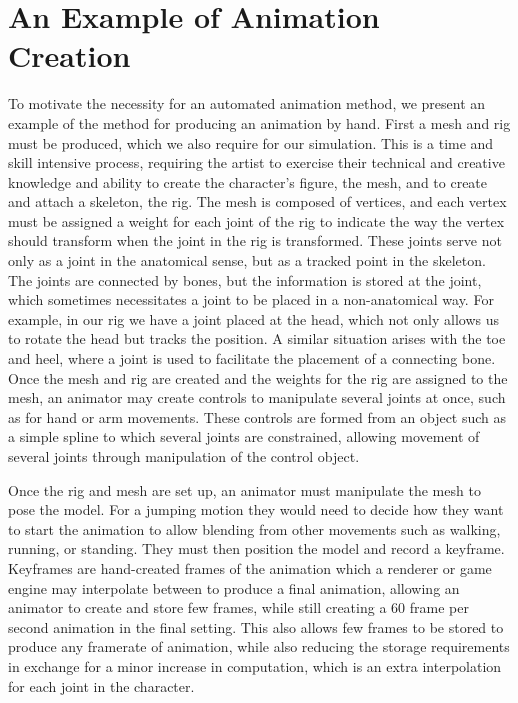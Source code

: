 \section{An Example of Animation Creation}
To motivate the necessity for an automated animation method, we present an example of the method for producing an animation by hand.  First a mesh and rig must be produced, which we also require for our simulation.  This is a time and skill intensive process, requiring the artist to exercise their technical and creative knowledge and ability to create the character's figure, the mesh, and to create and attach a skeleton, the rig.  The mesh is composed of vertices, and each vertex must be assigned a weight for each joint of the rig to indicate the way the vertex should transform when the joint in the rig is transformed.  These joints serve not only as a joint in the anatomical sense, but as a tracked point in the skeleton.  The joints are connected by bones, but the information is stored at the joint, which sometimes necessitates a joint to be placed in a non-anatomical way.  For example, in our rig we have a joint placed at the head, which not only allows us to rotate the head but tracks the position.  A similar situation arises with the toe and heel, where a joint is used to facilitate the placement of a connecting bone.  Once the mesh and rig are created and the weights for the rig are assigned to the mesh, an animator may create controls to manipulate several joints at once, such as for hand or arm movements.  These controls are formed from an object such as a simple spline to which several joints are constrained, allowing movement of several joints through manipulation of the control object.

Once the rig and mesh are set up, an animator must manipulate the mesh to pose the model.  For a jumping motion they would need to decide how they want to start the animation to allow blending from other movements such as walking, running, or standing.  They must then position the model and record a keyframe.  Keyframes are hand-created frames of the animation which a renderer or game engine may interpolate between to produce a final animation, allowing an animator to create and store few frames, while still creating a 60 frame per second animation in the final setting.  This also allows few frames to be stored to produce any framerate of animation, while also reducing the storage requirements in exchange for a minor increase in computation, which is an extra interpolation for each joint in the character.

